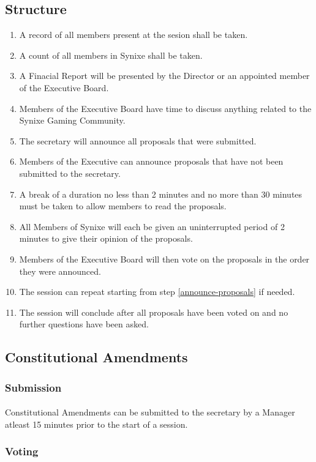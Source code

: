 \documentclass[10pt,a4paper]{article}
\begin{document}
\subsection{Structure}
\begin{enumerate}
	\item A record of all members present at the sesion shall be taken.
	\item A count of all members in Synixe shall be taken.
	\item A Finacial Report will be presented by the Director or an appointed member of the Executive Board.
	\item Members of the Executive Board have time to discuss anything related to the Synixe Gaming Community.
	\item The secretary will announce all proposals that were submitted.
	\item\label{announce-proposals} Members of the Executive can announce proposals that have not been submitted to the secretary.
	\item A break of a duration no less than 2 minutes and no more than 30 minutes must be taken to allow members to read the proposals.
	\item All Members of Synixe will each be given an uninterrupted period of 2 minutes to give their opinion of the proposals.
	\item Members of the Executive Board will then vote on the proposals in the order they were announced.
	\item The session can repeat starting from step \ref{announce-proposals} if needed.
	\item The session will conclude after all proposals have been voted on and no further questions have been asked.
\end{enumerate}
\subsection{Constitutional Amendments}
\subsubsection{Submission}
\paragraph{}
Constitutional Amendments can be submitted to the secretary by a Manager atleast 15 minutes prior to the start of a session.
\subsubsection{Voting}
\end{document}
